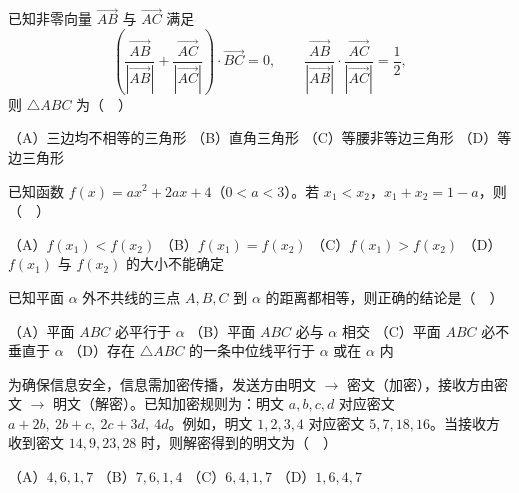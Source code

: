 \begin{question}
已知非零向量 \(\overrightarrow{AB}\) 与 \(\overrightarrow{AC}\) 满足
\nopagebreak[4]
\[
\left(\frac{\overrightarrow{AB}}{|\overrightarrow{AB}|}+\frac{\overrightarrow{AC}}{|\overrightarrow{AC}|}\right)\cdot\overrightarrow{BC}=0,
\qquad
\frac{\overrightarrow{AB}}{|\overrightarrow{AB}|}\cdot\frac{\overrightarrow{AC}}{|\overrightarrow{AC}|}=\frac12,
\]
则 \(\triangle ABC\) 为（　）

（A）三边均不相等的三角形
（B）直角三角形
（C）等腰非等边三角形
（D）等边三角形

\end{question}
\begin{question}
已知函数 \(f(x)=ax^2+2ax+4\)（\(0<a<3\)）。若 \(x_1<x_2\)，\(x_1+x_2=1-a\)，则（　）

（A）\(f(x_1)<f(x_2)\)
（B）\(f(x_1)=f(x_2)\)
（C）\(f(x_1)>f(x_2)\)
（D）\(f(x_1)\) 与 \(f(x_2)\) 的大小不能确定

\end{question}
\begin{question}
已知平面 \(\alpha\) 外不共线的三点 \(A,B,C\) 到 \(\alpha\) 的距离都相等，则正确的结论是（　）

（A）平面 \(ABC\) 必平行于 \(\alpha\)
（B）平面 \(ABC\) 必与 \(\alpha\) 相交
（C）平面 \(ABC\) 必不垂直于 \(\alpha\)
（D）存在 \(\triangle ABC\) 的一条中位线平行于 \(\alpha\) 或在 \(\alpha\) 内

\end{question}
\begin{question}
为确保信息安全，信息需加密传播，发送方由明文 \(\to\) 密文（加密），接收方由密文 \(\to\) 明文（解密）。已知加密规则为：明文 \(a,b,c,d\) 对应密文 \(a+2b,\ 2b+c,\ 2c+3d,\ 4d\)。例如，明文 \(1,2,3,4\) 对应密文 \(5,7,18,16\)。当接收方收到密文 \(14,9,23,28\) 时，则解密得到的明文为（　）

（A）\(4,6,1,7\)
（B）\(7,6,1,4\)
（C）\(6,4,1,7\)
（D）\(1,6,4,7\)

\end{question}

